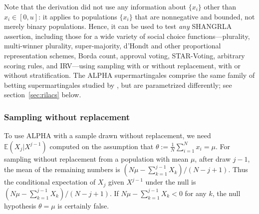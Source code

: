 \documentclass[aoas]{imsart}
\newcommand{\EE}{\mathbb{E}}
\begin{document}
Note that the derivation did not use any information about $\{x_i\}$ other than $x_i \in [0, u]$:
it applies to populations $\{x_i\}$ that are nonnegative and bounded, not merely binary populations.
Hence, it can be used to test \emph{any} SHANGRLA assertion, including those for
a wide variety of social choice functions---plurality, multi-winner plurality, super-majority, d'Hondt and other
proportional representation schemes, Borda count, approval voting, STAR-Voting, arbitrary scoring rules, and 
IRV---using sampling with or without replacement, with or without stratification.
The ALPHA supermartingales comprise the same family of betting supermartingales studied by 
\citet{waudby-smithRamdas21,waudby-smithEtal21}, but are parametrized
differently; see section~\ref{sec:rilacs} below.

\subsubsection{Sampling without replacement}
To use ALPHA with a sample drawn without replacement, we need $\EE(X_j | X^{j-1})$ computed on the assumption that
$\theta :=  \frac{1}{N} \sum_{i=1}^N x_i = \mu$.
For sampling without replacement from a population with mean $\mu$, after draw $j-1$, the mean of the remaining numbers is $(N\mu - \sum_{k=1}^{j-1}X_k)/(N-j+1)$.
Thus the conditional expectation of $X_j$ given $X^{j-1}$ under the null is $(N\mu - \sum_{k=1}^{j-1}X_k)/(N-j+1)$.
If $N\mu - \sum_{k=1}^{j-1}X_k < 0$ for any $k$, the null hypothesis $\theta = \mu$ is certainly false.
\end{document}

